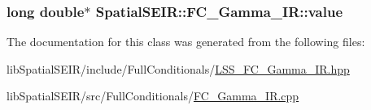 \hypertarget{classSpatialSEIR_1_1FC__Gamma__IR_ac34f1496de3501478a9915cc8930f56c}{
\subsubsection[{value}]{\setlength{\rightskip}{0pt plus 5cm}long double$\ast$ Spatial\-S\-E\-I\-R\-::\-F\-C\-\_\-\-Gamma\-\_\-\-I\-R\-::value}}\label{classSpatialSEIR_1_1FC__Gamma__IR_ac34f1496de3501478a9915cc8930f56c}


The documentation for this class was generated from the following files\-:\begin{DoxyCompactItemize}
\item 
lib\-Spatial\-S\-E\-I\-R/include/\-Full\-Conditionals/\hyperlink{LSS__FC__Gamma__IR_8hpp}{L\-S\-S\-\_\-\-F\-C\-\_\-\-Gamma\-\_\-\-I\-R.\-hpp}\item 
lib\-Spatial\-S\-E\-I\-R/src/\-Full\-Conditionals/\hyperlink{FC__Gamma__IR_8cpp}{F\-C\-\_\-\-Gamma\-\_\-\-I\-R.\-cpp}\end{DoxyCompactItemize}
